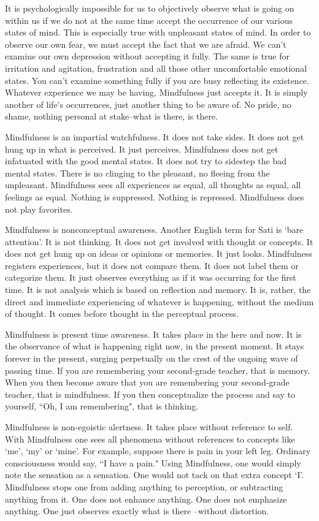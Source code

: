 It is psychologically impossible for us to objectively observe what is going on
within us if we do not at the same time accept the occurrence of our various
states of mind. This is especially true with unpleasant states of mind. In order
to observe our own fear, we must accept the fact that we are afraid. We can't
examine our own depression without accepting it fully. The same is true for
irritation and agitation, frustration and all those other uncomfortable
emotional states. You can't examine something fully if you are busy reflecting
its existence. Whatever experience we may be having, Mindfulness just accepts
it. It is simply another of life's occurrences, just another thing to be aware
of. No pride, no shame, nothing personal at stake--what is there, is there.

Mindfulness is an impartial watchfulness. It does not take sides. It does not
get hung up in what is perceived. It just perceives.  Mindfulness does not get
infatuated with the good mental states. It does not try to sidestep the bad
mental states. There is no clinging to the pleasant, no fleeing from the
unpleasant. Mindfulness sees all experiences as equal, all thoughts as equal,
all feelings as equal. Nothing is suppressed. Nothing is repressed. Mindfulness
does not play favorites.

Mindfulness is nonconceptual awareness. Another English term for Sati is `bare
attention'. It is not thinking. It does not get involved with thought or
concepts. It does not get hung up on ideas or opinions or memories. It just
looks. Mindfulness registers experiences, but it does not compare them. It does
not label them or categorize them. It just observes everything as if it was
occurring for the first time. It is not analysis which is based on reflection
and memory. It is, rather, the direct and immediate experiencing of whatever is
happening, without the medium of thought. It comes before thought in the
perceptual process.

Mindfulness is present time awareness. It takes place in the here and now. It is
the observance of what is happening right now, in the present moment. It stays
forever in the present, surging perpetually on the crest of the ongoing wave of
passing time. If you are remembering your second-grade teacher, that is memory.
When you then become aware that you are remembering your second-grade teacher,
that is mindfulness. If you then conceptualize the process and say to yourself,
``Oh, I am remembering", that is thinking.

Mindfulness is non-egoistic alertness. It takes place without reference to self.
With Mindfulness one sees all phenomena without references to concepts like
`me', `my' or `mine'. For example, suppose there is pain in your left leg.
Ordinary consciousness would say, ``I have a pain." Using Mindfulness, one would
simply note the sensation as a sensation. One would not tack on that extra
concept `I'. Mindfulness stops one from adding anything to perception, or
subtracting anything from it. One does not enhance anything. One does not
emphasize anything. One just observes exactly what is there --without distortion.

